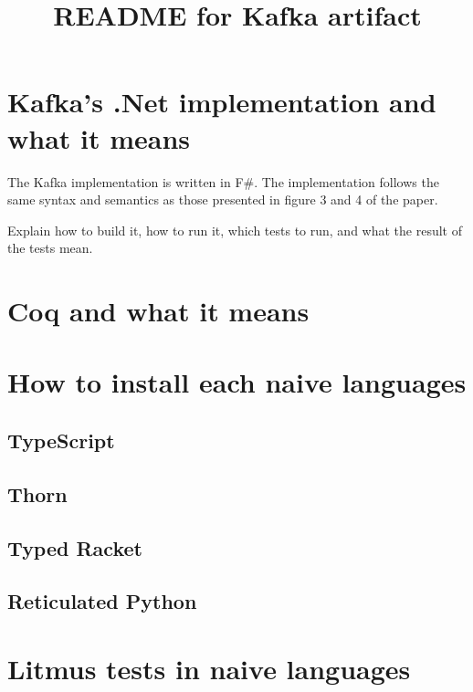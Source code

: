 \documentclass[]{article}
\title{README for Kafka artifact}
\author{}
\date{}
\begin{document}
\maketitle

\section{Kafka's .Net implementation and what it means}

The Kafka implementation is written in F#. The implementation follows the same syntax and semantics as those presented in figure 3 and 4 of the paper. 

Explain how to build it, how to run it, which tests to run, and what the result of the tests mean.


\section{Coq and what it means}


\section{How to install each naive languages}



\subsection{TypeScript}



\subsection{Thorn}



\subsection{Typed Racket}



\subsection{Reticulated Python}



\section{Litmus tests in naive languages}
\end{document}
